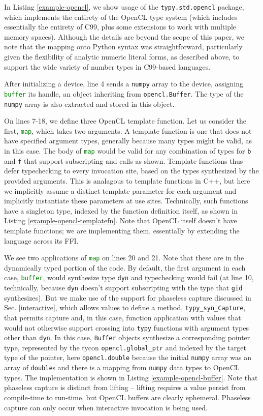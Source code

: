 \documentclass[preprint,10pt]{sigplanconf}
\newcommand{\lip}[1]{\lstinline[language=Python,basicstyle=\ttfamily\small,deletendkeywords={tuple,buffer,map}]{#1}}
\begin{document}
In Listing \ref{example-opencl}, we show usage of the \lip{typy.std.opencl} package, which implements the entirety of the OpenCL type system (which includes essentially the entirety of C99, plus some extensions to work with multiple memory spaces). Although the details are beyond the scope of this paper, we note that the mapping onto Python syntax was straightforward, particularly given the flexibility of analytic numeric literal forms, as described above, to support the wide variety of number types in C99-based languages. 

After initializing a device, line 4 sends a \lip{numpy} array to the device, assigning \lip{buffer} its handle, an object inheriting from \lip{opencl.Buffer}. The type of the \lip{numpy} array is also extracted and stored in this object.

On lines 7-18, we define three OpenCL template function. Let us consider the first, \lip{map}, which takes two arguments. A template function is one that does not have specified argument types, generally because many types might be valid, as in this case. The body of \lip{map} would be valid for any combination of types for \lip{b} and \lip{f} that support subscripting and calls as shown. Template functions thus defer typechecking to every invocation site, based on the types synthesized by the provided arguments. This is analagous to template functions in C++, but here we implicitly assume a distinct template parameter for each argument and implicitly instantiate these parameters at use sites. Technically, such functions have a singleton type, indexed by the function definition itself, as shown in Listing \ref{example-opencl-templatefn}. Note that  OpenCL itself doesn't have template functions; we are implementing them, essentially by extending the language across its FFI. 

We see two applications of \lip{map} on lines 20 and 21. Note that these are in the dynamically typed portion of the code. By default, the first argument in each case, \lip{buffer}, would synthesize type \lip{dyn} and typechecking would fail (at line 10, technically, because \lip{dyn} doesn't support subscripting with the type that \lip{gid} synthesizes).  But we make use of the support for phaseless capture discussed in Sec. \ref{interactive}, which allows values to define a method, \lip{typy_syn_Capture}, that permits capture and, in this case, function application with values that would not otherwise support crossing into \lip{typy} functions with argument types other than \lip{dyn}. In this case, \lip{Buffer} objects synthesize a corresponding pointer type, represented by the tycon \lip{opencl.global_ptr} and indexed by the target type of the pointer, here \lip{opencl.double} because the initial \lip{numpy} array was an array of \lip{double}s and there is a mapping from \lip{numpy} data types to OpenCL types. The implementation is shown in Listing \ref{example-opencl-buffer}. Note that phaseless capture is distinct from lifting -- lifting requires a value persist from compile-time to run-time, but OpenCL buffers are clearly ephemeral. Phaseless capture can only occur when interactive invocation is being used.
\end{document}
